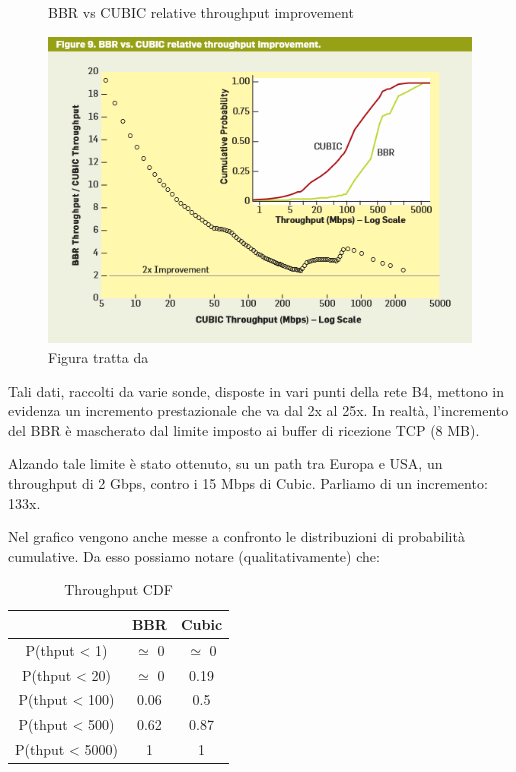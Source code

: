 \begin{figure}[H]

\center
\caption{BBR vs CUBIC relative throughput improvement}
\includegraphics[scale=1]{chapters/application/img/bbr_vs_cubic_1}
\caption*{Figura tratta da \cite[p.~64]{Cardwell:2017:BCC:3042068.3009824}}

\end{figure}

Tali dati, raccolti da varie sonde, disposte in vari punti della rete B4, mettono in evidenza un incremento prestazionale che va dal 2x al 25x. In realtà, l'incremento del BBR è mascherato dal limite imposto ai buffer di ricezione TCP (8 MB). \bigskip

Alzando tale limite è stato ottenuto, su un path tra Europa e USA, un throughput di 2 Gbps, contro i 15 Mbps di Cubic. Parliamo di un incremento: 133x. \bigskip

Nel grafico vengono anche messe a confronto le distribuzioni di probabilità cumulative. Da esso possiamo notare (qualitativamente) che:

\begin{table}[H]

\centering
\caption{Throughput CDF}	

\begin{tabular}{ccc}

\toprule
 & BBR & Cubic \\
\midrule
P(thput < 1) & $ \simeq $ 0 & $ \simeq $ 0 \\
\midrule
P(thput < 20) & $ \simeq $ 0 & 0.19  \\
\midrule
P(thput < 100) & 0.06 & 0.5 \\
\midrule
P(thput < 500) & 0.62 & 0.87  \\
\midrule
P(thput < 5000) & 1 & 1  \\
\bottomrule

\end{tabular}
\end{table}

